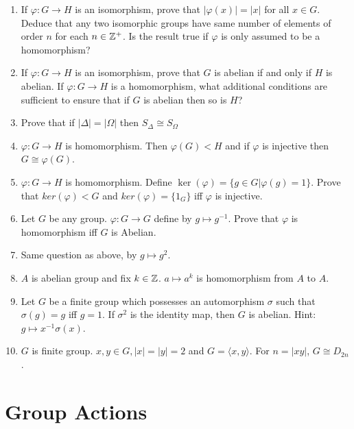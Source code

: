 \documentclass[12pt, a4paper, openany, twoside]{book}
\theoremstyle{definition}
\theoremstyle{remark}
\theoremstyle{plain}
\numberwithin{equation}{section}
\begin{document}
\begin{tcolorbox}[colback=yellow!10!white,colframe=violet!75!white,title=Exercise Ch 1.6.,breakable]

\begin{enumerate}
    \item If $\varphi : G \rightarrow H$ is an isomorphism, prove that $|\varphi(x)| = |x|$ for all $x \in G$. 
    Deduce that any two isomorphic groups have same number of elements of order $n$ for each $n \in {\mathbb {Z}}^+$. 
    Is the result true if $\varphi$ is only assumed to be a homomorphism?
    \item If $\varphi : G \rightarrow H$ is an isomorphism, prove that $G$ is abelian if and only if $H$ is abelian. If $\varphi : G \rightarrow H$ is a homomorphism, what additional conditions are sufficient to ensure that if $G$ is abelian then so is $H$?
    \item Prove that if $|\Delta| = |\Omega|$ then $S_{\Delta} \cong S_\Omega$
    \item $\varphi : G \rightarrow H$ is homomorphism. Then $\varphi(G) < H$ and if $\varphi$ is injective then $G \cong \varphi(G)$. 
    \item $\varphi : G \rightarrow H$ is homomorphism. Define $\ker(\varphi) = \{g \in G | \varphi(g) = 1\}$. Prove that $ker(\varphi) < G$ and $ker(\varphi) = \{1_G\}$ iff $\varphi$ is injective. 
    \item Let $G$ be any group. $\varphi : G \rightarrow G$ define by $g \mapsto g^{-1}$. Prove that $\varphi$ is homomorphism iff $G$ is Abelian.
    \item Same question as above, by $g \mapsto g^2$. 
    \item $A$ is abelian group and fix $k \in {\mathbb {Z}}$. $a \mapsto a^k$ is homomorphism from $A$ to $A$. 
    \item Let $G$ be a finite group which possesses an automorphism $\sigma$ such that $\sigma(g) = g$ iff $g = 1$. If $\sigma^2$ is the identity map, then $G$ is abelian. Hint: $g \mapsto x^{-1}\sigma(x)$. 
    \item $G$ is finite group. $x, y \in G, |x| = |y| = 2$ and $G = \langle x, y \rangle$. For $n = |xy|$, $G \cong D_{2n}$. 
\end{enumerate}


\end{tcolorbox}

\newpage 

\section{Group Actions}
\end{document}
